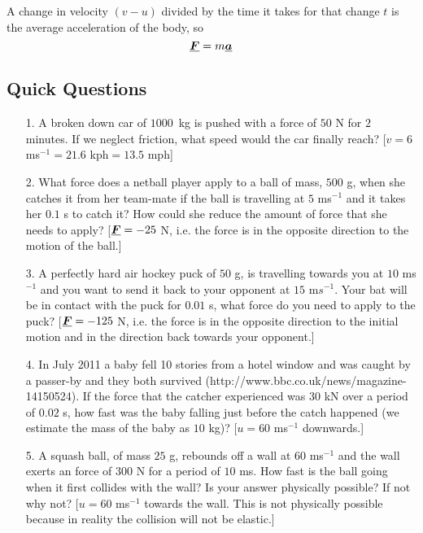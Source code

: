 \noindent A change in velocity $(v-u)$ divided by the time it takes for that change $t$ is the average acceleration of the body, so
\begin{equation}
{\mathit{\underline{\boldsymbol{F}}}}=m{\mathit{\underline{\boldsymbol{a}}}}
\end{equation}


\subsection*{Quick Questions}
\begin{itemize}
\item[1.] A broken down car of $1000$\ kg is pushed with a force of $50$ N for $2$ minutes.  If we neglect friction, what speed would the car finally reach? \color{red}[$v=6$ ms$^{-1}=21.6$ kph$=13.5$ mph]\color{black}
\item[2.] What force does a netball player apply to a ball of mass, $500$ g, when she catches it from her team-mate if the ball is travelling at $5$ ms$^{-1}$ and it takes her $0.1$ s to catch it?  How could she reduce the amount of force that she needs to apply? \color{red}[${\mathit{\underline{\boldsymbol{F}}}}=-25$ N, i.e. the force is in the opposite direction to the motion of the ball.]\color{black}
\item[3.] A perfectly hard air hockey puck of $50$ g, is travelling towards you at $10$ ms$^{-1}$ and you want to send it back to your opponent at $15$ m$s^{-1}$.  Your bat will be in contact with the puck for $0.01$ s, what force do you need to apply to the puck? \color{red}[${\mathit{\underline{\boldsymbol{F}}}}=-125$ N, i.e. the force is in the opposite direction to the initial motion and in the direction back towards your opponent.] \color{black}
\item[4.] In July 2011 a baby fell 10 stories from a hotel window and was caught by a passer-by and they both survived (http://www.bbc.co.uk/news/magazine-14150524).  If the force that the catcher experienced was $30$ kN over a period of $0.02$ s, how fast was the baby falling just before the catch happened (we estimate the mass of the baby as $10$ kg)? \color{red}[$u=60$ ms$^{-1}$ downwards.]\color{black}
\item[5.] A squash ball, of mass $25$ g, rebounds off a wall at $60$ ms$^{-1}$ and the wall exerts an force of $300$ N for a period of $10$ ms.  How fast is the ball going when it first collides with the wall?  Is your answer physically possible? If not why not? \color{red}[$u=60$  ms$^{-1}$ towards the wall.  This is not physically possible because in reality the collision will not be elastic.]\color{black}
\end{itemize}

